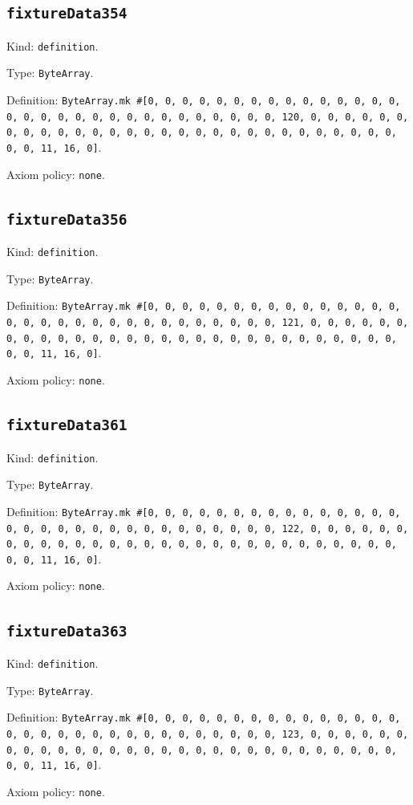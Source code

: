 \documentclass[11pt]{article}
\begin{document}
\subsection*{\texttt{fixtureData354}}
\noindent Kind: \texttt{definition}.\par
\noindent Type: \texttt{ByteArray}.\par
\noindent Definition: \texttt{ByteArray.mk \#[0, 0, 0, 0, 0, 0, 0, 0, 0, 0, 0, 0, 0, 0, 0, 0, 0, 0, 0, 0, 0, 0, 0, 0, 0, 0, 0, 0, 0, 0, 0, 120, 0, 0, 0, 0, 0, 0, 0, 0, 0, 0, 0, 0, 0, 0, 0, 0, 0, 0, 0, 0, 0, 0, 0, 0, 0, 0, 0, 0, 0, 0, 0, 11, 16, 0]}.\par
\noindent Axiom policy: \texttt{none}.\par
\subsection*{\texttt{fixtureData356}}
\noindent Kind: \texttt{definition}.\par
\noindent Type: \texttt{ByteArray}.\par
\noindent Definition: \texttt{ByteArray.mk \#[0, 0, 0, 0, 0, 0, 0, 0, 0, 0, 0, 0, 0, 0, 0, 0, 0, 0, 0, 0, 0, 0, 0, 0, 0, 0, 0, 0, 0, 0, 0, 121, 0, 0, 0, 0, 0, 0, 0, 0, 0, 0, 0, 0, 0, 0, 0, 0, 0, 0, 0, 0, 0, 0, 0, 0, 0, 0, 0, 0, 0, 0, 0, 11, 16, 0]}.\par
\noindent Axiom policy: \texttt{none}.\par
\subsection*{\texttt{fixtureData361}}
\noindent Kind: \texttt{definition}.\par
\noindent Type: \texttt{ByteArray}.\par
\noindent Definition: \texttt{ByteArray.mk \#[0, 0, 0, 0, 0, 0, 0, 0, 0, 0, 0, 0, 0, 0, 0, 0, 0, 0, 0, 0, 0, 0, 0, 0, 0, 0, 0, 0, 0, 0, 0, 122, 0, 0, 0, 0, 0, 0, 0, 0, 0, 0, 0, 0, 0, 0, 0, 0, 0, 0, 0, 0, 0, 0, 0, 0, 0, 0, 0, 0, 0, 0, 0, 11, 16, 0]}.\par
\noindent Axiom policy: \texttt{none}.\par
\subsection*{\texttt{fixtureData363}}
\noindent Kind: \texttt{definition}.\par
\noindent Type: \texttt{ByteArray}.\par
\noindent Definition: \texttt{ByteArray.mk \#[0, 0, 0, 0, 0, 0, 0, 0, 0, 0, 0, 0, 0, 0, 0, 0, 0, 0, 0, 0, 0, 0, 0, 0, 0, 0, 0, 0, 0, 0, 0, 123, 0, 0, 0, 0, 0, 0, 0, 0, 0, 0, 0, 0, 0, 0, 0, 0, 0, 0, 0, 0, 0, 0, 0, 0, 0, 0, 0, 0, 0, 0, 0, 11, 16, 0]}.\par
\noindent Axiom policy: \texttt{none}.\par
\end{document}
